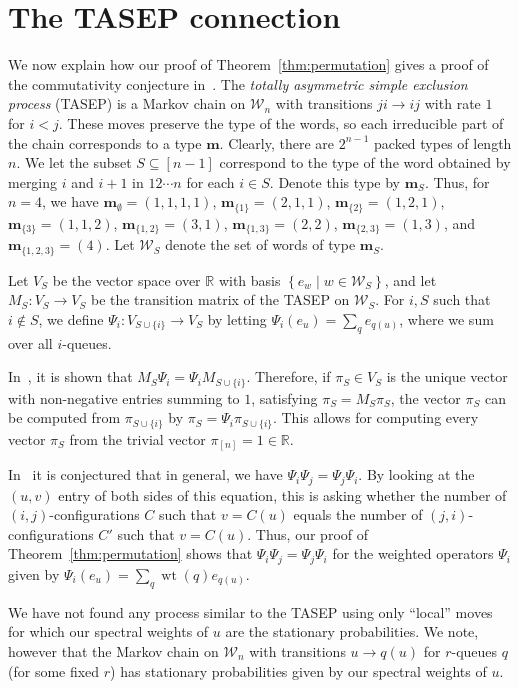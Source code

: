 \documentclass[submission]{FPSAC2018}
\DeclareMathOperator{\wt}{wt} %
\newcommand{\mm}{\mathbf{m}}
\newcommand{\mcW}{\mathcal{W}}
\newcommand{\RR}{\mathbb{R}}
\newcommand{\set}[1]{\left\{ #1 \right\}}
\newcommand{\defn}[1]{{\color{darkred}\emph{#1}}} %
\theoremstyle{plain}
\theoremstyle{definition}
\numberwithin{equation}{section}
\begin{document}
\section{The TASEP connection}
\label{sec:tasep}

We now explain how our proof of Theorem~\ref{thm:permutation} gives a proof of the commutativity conjecture in~\cite{AAMP}.
The \defn{totally asymmetric simple exclusion process} (TASEP) is a Markov chain on $\mcW_{n}$ with transitions $ji \to ij$ with rate $1$ for $i < j$.
These moves preserve the type of the words, so each irreducible part of the chain corresponds to a type $\mm$.
Clearly, there are $2^{n-1}$ packed types of length $n$.
We let the subset $S \subseteq [n-1]$ correspond to the type of the word obtained by merging $i$ and $i+1$ in $12 \dotsm n$ for each $i \in S$.
Denote this type by $\mm_S$.
Thus, for $n = 4$, we have $\mm_{\emptyset} = (1,1,1,1)$, $\mm_{\{1\}} = (2,1,1)$, $\mm_{\{2\}} = (1,2,1)$, $\mm_{\{3\}} = (1,1,2)$, $\mm_{\{1,2\}} = (3,1)$, $\mm_{\{1,3\}} = (2,2)$, $\mm_{\{2,3\}} = (1,3)$, and $\mm_{\{1,2,3\}} = (4)$.
Let $\mcW_S$ denote the set of words of type $\mm_S$.

Let $V_S$ be the vector space over $\RR$ with basis $\set{e_w \mid w \in \mcW_S}$, and let $M_S \colon V_S \to V_S$ be the transition matrix of the TASEP on $\mcW_S$.
For $i,S$ such that $i\notin S$, we define $\Psi_i \colon V_{S \cup \{i\}} \to V_S$ by letting $\Psi_i(e_u) = \sum_{q} e_{q(u)}$, where we sum over all $i$-queues.

In~\cite{AAMP}, it is shown that $M_S \Psi_i = \Psi_i M_{S\cup\{i\}}$.
Therefore, if $\pi_S \in V_S$ is the unique vector with non-negative entries summing to $1$, satisfying $\pi_S = M_S \pi_S$, the vector $\pi_S$ can be computed from $\pi_{S\cup\{i\}}$ by $\pi_S = \Psi_i \pi_{S\cup\{i\}}$.
This allows for computing every vector $\pi_S$ from the trivial vector $\pi_{[n]} = 1 \in \RR$.

In~\cite{AAMP} it is conjectured that in general, we have $\Psi_i \Psi_j = \Psi_j\Psi_i$.
By looking at the $(u,v)$ entry of both sides of this equation, this is asking whether the number of $(i,j)$-configurations $C$ such that $v = C(u)$ equals the number of $(j,i)$-configurations $C'$ such that $v = C(u)$. 
Thus, our proof of Theorem~\ref{thm:permutation} shows that $\Psi_i \Psi_j = \Psi_j \Psi_i$ for the weighted operators $\Psi_i$ given by $\Psi_i(e_u) = \sum_q \wt(q) e_{q(u)}$.

We have not found any process similar to the TASEP using only ``local'' moves for which our spectral weights of $u$ are the stationary probabilities.
We note, however that the Markov chain on $\mcW_n$ with transitions $u \to q(u)$ for $r$-queues $q$ (for some fixed $r$) has stationary probabilities given by our spectral weights of $u$. 
\end{document}
